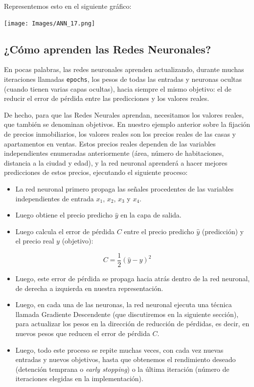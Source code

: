 \documentclass[
]{book}
\providecommand{\tightlist}{%
  \setlength{\itemsep}{0pt}\setlength{\parskip}{0pt}}
\begin{document}
Representemos esto en el siguiente gráfico:

\texttt{[image: Images/ANN\_17.png]}

\hypertarget{cuxf3mo-aprenden-las-redes-neuronales}{%
\subsection{¿Cómo aprenden las Redes Neuronales?}\label{cuxf3mo-aprenden-las-redes-neuronales}}

En pocas palabras, las redes neuronales aprenden actualizando, durante muchas iteraciones llamadas \texttt{epochs}, los pesos de todas las entradas y neuronas ocultas (cuando tienen varias capas ocultas), hacia siempre el mismo objetivo: el de reducir el error de pérdida entre las predicciones y los valores reales.

De hecho, para que las Redes Neurales aprendan, necesitamos los valores reales, que también se denominan objetivos. En nuestro ejemplo anterior sobre la fijación de precios inmobiliarios, los valores reales son los precios reales de las casas y apartamentos en ventas. Estos precios reales dependen de las variables independientes enumeradas anteriormente (área, número de habitaciones, distancia a la ciudad y edad), y la red neuronal aprenderá a hacer mejores predicciones de estos precios, ejecutando el siguiente proceso:

\begin{itemize}
\tightlist
\item
  La red neuronal primero propaga las señales procedentes de las variables independientes de entrada \(x_1\), \(x_2\), \(x_3\) y \(x_4\).
\item
  Luego obtiene el precio predicho \(\hat{y}\) en la capa de salida.\\
\item
  Luego calcula el error de pérdida \(C\) entre el precio predicho \(\hat{y}\) (predicción) y el precio real \(y\) (objetivo):
\end{itemize}

\[C = \frac{1}{2} (\hat{y} - y)^2\]

\begin{itemize}
\tightlist
\item
  Luego, este error de pérdida se propaga hacia atrás dentro de la red neuronal, de derecha a izquierda en nuestra representación.\\
\item
  Luego, en cada una de las neuronas, la red neuronal ejecuta una técnica llamada Gradiente Descendente (que discutiremos en la siguiente sección), para actualizar los pesos en la dirección de reducción de pérdidas, es decir, en nuevos pesos que reducen el error de pérdida \(C\).\\
\item
  Luego, todo este proceso se repite muchas veces, con cada vez nuevas entradas y nuevos objetivos, hasta que obtenemos el rendimiento deseado (detención temprana o \emph{early stopping}) o la última iteración (número de iteraciones elegidas en la implementación).
\end{itemize}
\end{document}
